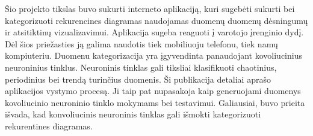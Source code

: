 Šio projekto tikslas buvo sukurti interneto aplikaciją, kuri sugebėti sukurti bei kategorizuoti rekurencines diagramas naudojamas duomenų duomenų dėsningumų ir atsitiktinų vizualizavimui.
Aplikacija sugeba reaguoti į varotojo įrenginio dydį.
Dėl šios priežasties ją galima naudotis tiek mobiliuoju telefonu, tiek namų kompiuteriu.
Duomenu kategorizacija yra įgyvendinta panaudojant kovoliucinius neuroninius tinklus.
Neuroninis tinklas gali tiksliai klasifikuoti chaotinius, periodinius bei trendą turinčius duomenis.
Ši publikacija detaliai aprašo aplikacijos vystymo procesą.
Ji taip pat nupasakoja kaip generuojami duomenys kovoliucinio neuroninio tinklo mokymams bei testavimui.
Galiausiai, buvo prieita išvada, kad konvoliucinis neuroninis tinklas gali išmokti kategorizuoti rekurentines diagramas. 